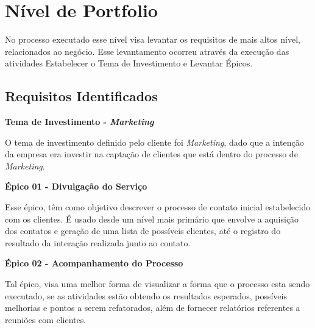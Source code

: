 \chapter[Nível de Portfolio]{Nível de Portfolio}

No processo executado esse nível visa levantar os requisitos de mais altos nível, relacionados ao negócio. Esse levantamento
ocorreu através da execução das atividades Estabelecer o Tema de Investimento e Levantar Épicos.

\section{Requisitos Identificados}

\textbf{Tema de Investimento - \textit{Marketing}}

O tema de investimento definido pelo cliente foi \textit{Marketing}, dado que a intenção da empresa era investir na captação de clientes que está
dentro do processo de \textit{Marketing}.

\textbf{Épico 01 - Divulgação do Serviço}

Esse épico, têm como objetivo descrever o processo de contato inicial estabelecido com os clientes. É usado desde um nível mais primário que envolve a aquisição dos contatos e geração de uma lista de possíveis clientes, até o registro do resultado da interação realizada junto ao contato.


\textbf{Épico 02 - Acompanhamento do Processo}

Tal épico, visa uma melhor forma de visualizar a forma que o processo esta sendo executado, se as atividades estão obtendo os resultados esperados, possíveis melhorias e pontos a serem refatorados, além de fornecer relatórios referentes a reuniões com clientes.
